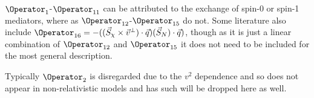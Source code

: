 \par
$\Operator_{1}$-$\Operator_{11}$ can be attributed to the exchange of spin-0 or spin-1 mediators, where as $\Operator_{12}$-$\Operator_{15}$ do not.
Some literature also include $\Operator_{16}=-((\vec{S}_\chi \times \vec{v}^{\bot}) \cdot \vec{q})(\vec{S}_N) \cdot \vec{q})$, though as it is just a linear combination of $\Operator_{12}$ and $\Operator_{15}$ it does not need to be included for the most general description.

\par
Typically $\Operator_{2}$ is disregarded due to the $v^{2}$ dependence and so does not appear in non-relativistic models and has such will be dropped here as well.

